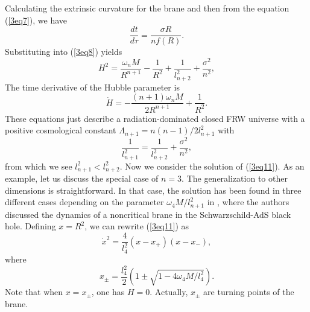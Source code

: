 \documentclass[a4paper,12pt]{article}
\begin{document}
Calculating the extrinsic curvature for the brane and then from the
equation (\ref{3eq7}), we have
\begin{equation}
\label{3eq10}
 \frac{dt}{d\tau}= \frac{\sigma R}{nf(R)}.
\end{equation}
Substituting into (\ref{3eq8}) yields
\begin{equation}
\label{3eq11}
H^2 = \frac{\omega_n M}{R^{n+1}}
 -\frac{1}{R^2}+\frac{1}{l_{n+2}^2} +\frac{\sigma^2}{n^2},
 \end{equation}
 The time derivative of the Hubble parameter is
 \begin{equation}
 \label{3eq12}
\dot H =-\frac{(n+1)\omega_n M}{2R^{n+1}} +\frac{1}{R^2}.
\end{equation}
These equations just describe a radiation-dominated closed FRW
universe with a positive cosmological constant $\Lambda_{n+1}=
n(n-1)/2l^2_{n+1}$ with
\begin{equation}
 \label{3eq13}
 \frac{1}{l_{n+1}^2}=
    \frac{1}{l_{n+2}^2} +
       \frac{\sigma^2}{n^2},
 \end{equation}
 from which we see $l^2_{n+1} < l^2_{n+2}$. Now we consider the solution
  of (\ref{3eq11}). As an example, let us discuss the special case of  
$n=3$. The generalization to other dimensions is straightforward. In that 
case, the solution has been found in three different cases depending 
on the parameter $\omega_4 M/l^2_{n+1}$ in
 \cite{PS}, where the authors discussed the dynamics of  a noncritical
 brane in the Schwarzschild-AdS black hole. Defining $x=R^2$, we
 can rewrite (\ref{3eq11}) as
 \begin{equation}
 \label{3eq14}
 \dot x^2 =\frac{4}{l_4^2}(x-x_+)(x-x_-),
 \end{equation}
where
\begin{equation}
x_{\pm} =\frac{l^2_4}{2}\left(1 \pm
\sqrt{1-4\omega_4M/l_4^2}\right).
\end{equation}
Note that when $x=x_{\pm}$, one has $H=0$. Actually, $x_{\pm}$ are turning 
points of the brane.
\end{document}
